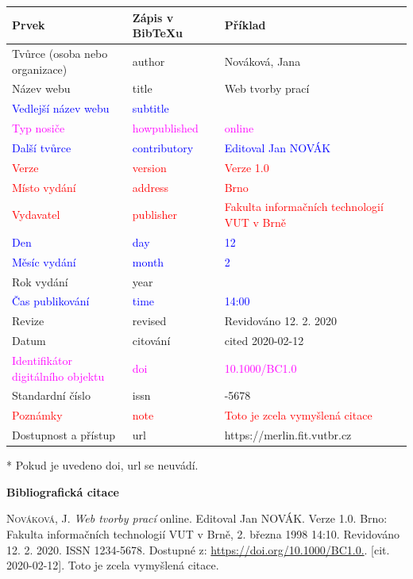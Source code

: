 \begin{tabularx}{0.95\linewidth}{>{\raggedright\arraybackslash}X X >{\raggedright\arraybackslash}X}
    Prvek & Zápis v BibTeXu & Příklad\\\hline
    Tvůrce (osoba nebo organizace) & author & Nováková, Jana\\
    Název webu & title & Web tvorby prací\\
    \textcolor{blue}{Vedlejší název webu} &  \textcolor{blue}{subtitle} & \\
    \textcolor{magenta}{Typ nosiče} & \textcolor{magenta}{howpublished} & \textcolor{magenta}{online}\\
    \textcolor{blue}{Další tvůrce} & \textcolor{blue}{contributory} & \textcolor{blue}{Editoval Jan NOVÁK}\\
    \textcolor{red}{Verze} & \textcolor{red}{version} & \textcolor{red}{Verze 1.0}\\
    \textcolor{red}{Místo vydání} & \textcolor{red}{address} & \textcolor{red}{Brno}\\
    \textcolor{red}{Vydavatel} & \textcolor{red}{publisher} & \textcolor{red}{Fakulta informačních technologií VUT v Brně}\\
    \textcolor{blue}{Den} & \textcolor{blue}{day} & \textcolor{blue}{12}\\
    \textcolor{blue}{Měsíc vydání} & \textcolor{blue}{month} & \textcolor{blue}{2}\\
    Rok vydání & year & 2020\\
    \textcolor{blue}{Čas publikování} & \textcolor{blue}{time} & \textcolor{blue}{14:00}\\
    Revize & revised & Revidováno 12. 2. 2020\\
    Datum & citování & cited 2020-02-12\\
    \textcolor{magenta}{Identifikátor digitálního objektu} & \textcolor{magenta}{doi} & \textcolor{magenta}{10.1000/BC1.0}\\
    Standardní číslo & issn & 1234-5678\\
    \textcolor{red}{Poznámky} & \textcolor{red}{note} & \textcolor{red}{Toto je zcela vymyšlená citace}\\
    Dostupnost a přístup & url & https://merlin.fit.vutbr.cz
\end{tabularx}

\bigskip
* Pokud je uvedeno doi, url se neuvádí.

\bigskip

\noindent \textbf{Bibliografická citace}

\medskip

\noindent \textsc{Nováková}, J. \textit{Web tvorby prací} online. Editoval Jan NOVÁK. Verze 1.0. Brno: Fakulta informačních technologií VUT v Brně, 2. března 1998 14:10. Revidováno 12. 2. 2020. ISSN 1234-5678. Dostupné z: \url{https://doi.org/10.1000/BC1.0.}. [cit. 2020-02-12]. Toto je zcela vymyšlená citace.

%
